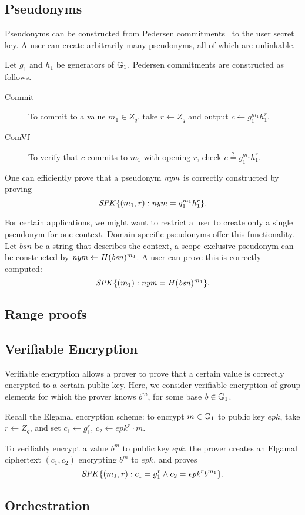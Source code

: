 \subsection{Pseudonyms}
Pseudonyms can be constructed from Pedersen commitments~\cite{peders91b} to the user secret key.
A user can create arbitrarily many pseudonyms, all of which are unlinkable.

Let $g_1$ and $h_1$ be generators of $\mathbb{G}_1$. 
Pedersen commitments are constructed as follows.
\begin{description}
\item[Commit] To commit to a value $m_1 \in Z_q$, take $r \gets Z_q$ and output $c \gets g_1^{m_1}h_1^r$.
\item[ComVf] To verify that $c$ commits to $m_1$ with opening $r$, check $c \stackrel{?}{=} g_1^{m_1}h_1^r$.
\end{description}

One can efficiently prove that a pseudonym $\mathit{nym}$ is correctly constructed by proving 
\[\mathit{SPK}\{(m_1, r) : \mathit{nym} = g_1^{m_1} h_1^r \}.\]

For certain applications, we might want to restrict a user to create only a single pseudonym for one context.
Domain specific pseudonyms offer this functionality. 
Let $\mathit{bsn}$ be a string that describes the context, a scope exclusive pseudonym can be constructed by $\mathit{nym} \gets H(\mathit{bsn})^{m_1}$. 
A user can prove this is correctly computed:
\[\mathit{SPK}\{(m_1) : \mathit{nym} = H(\mathit{bsn})^{m_1} \} .\]


\subsection{Range proofs}


\subsection{Verifiable Encryption}
Verifiable encryption allows a prover to prove that a certain value is correctly encrypted to a certain public key.
Here, we consider verifiable encryption of group elements for which the prover knows $b^m$, for some base $b \in \mathbb{G}_1$.

Recall the Elgamal encryption scheme: 
to encrypt $m \in \mathbb{G}_1$ to public key $\mathit{epk}$, take $r \gets Z_q$, and set $c_1 \gets g_1^r$, $c_2 \gets \mathit{epk}^r \cdot m$.

To verifiably encrypt a value $b^m$ to public key $\mathit{epk}$, the prover creates an Elgamal ciphertext $(c_1, c_2)$ encrypting $b^m$ to $\mathit{epk}$,
and proves
\[\mathit{SPK}\{(m_1, r) : c_1 = g_1^r \land c_2 = \mathit{epk}^r b^{m_1} \}.\]

\subsection{Orchestration}
